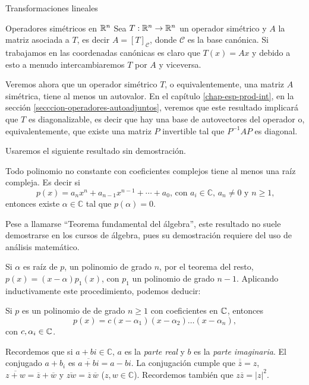 \begin{chapter}{Transformaciones lineales}
\begin{section}{Operadores simétricos en $\mathbb R^n$}
Sea $T:\mathbb R^n \to \mathbb R^n$ un operador simétrico y $A$ la matriz asociada a  $T$,  es decir $A = [T]_{\mathcal{C}}$,  donde $\mathcal{C}$  es la base canónica. Si trabajamos en las coordenadas canónicas es claro que $T(x) = Ax$ y debido a esto a menudo intercambiaremos  $T$ por $A$ y viceversa.  

 
    Veremos ahora que un operador simétrico $T$, o equivalentemente, una matriz $A$ simétrica, tiene al menos un autovalor. En el capítulo \ref{chap-esp-prod-int}, en la sección \ref{secccion-operadores-autoadjuntos}, veremos que este resultado implicará que $T$ es diagonalizable, es decir que hay una base de autovectores del operador o, equivalentemente, que existe una matriz $P$ invertible tal que $P^{-1}AP$ es diagonal. 
    
    Usaremos el siguiente resultado sin demostración.
    
    \begin{teorema}\label{th-fundamental-del-algebra}
        Todo polinomio no constante con coeficientes complejos tiene al menos una raíz compleja. Es decir si 
        \begin{equation*}
            \text{$p(x) = a_nx^n+ a_{n-1}x^{n-1} +\cdots+a_0$, con $a_i \in \mathbb{C}$,  $a_n\ne 0$ y $n\ge 1$,}
        \end{equation*}
        entonces existe $\alpha \in \mathbb{C}$ tal que $p(\alpha)=0$.
    \end{teorema}

    Pese a llamarse ``Teorema fundamental del álgebra'', este resultado  no suele demostrarse en los cursos de álgebra, pues su demostración requiere del uso de análisis matemático.
    
    Si $\alpha$ es raíz de $p$, un polinomio de grado $n$, por  el teorema del resto,  $p(x) = (x-\alpha)p_1(x)$, con  $p_1$ un polinomio de grado $n-1$.  Aplicando inductivamente este procedimiento, podemos deducir:
    
    \begin{corolario} Si $p$ es un polinomio de de grado $n\ge 1$ con coeficientes en $\mathbb C$,  entonces
        \begin{equation*}
            p(x)= c(x-\alpha_1)(x-\alpha_2)\ldots(x-\alpha_n),
        \end{equation*}
        con $c,\alpha_i \in \mathbb C$.
    \end{corolario}
    
    
    \begin{obs}\label{5.9} 	Recordemos que si $a+bi \in \mathbb{C}$, $a$ es la \textit{parte real} y $b$ es la \textit{parte imaginaria}. El conjugado $a+b_i$ es $\overline{a +bi} = a-bi$. La conjugación cumple que $\overline{\overline{z}} = z$, $\overline{z +w} = \overline{z}+\overline{w}$ y $\overline{z w} = \overline{z}\,\overline{w}$ ($z,w \in \mathbb{C}$). Recordemos también que $z\overline{z} = |z|^2$.
        

\end{obs}
\end{section}
\end{chapter}

